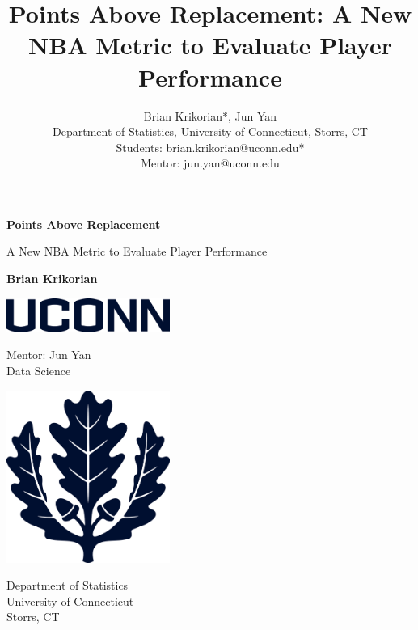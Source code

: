 \documentclass[12pt]{article}
\title{Points Above Replacement: A New NBA Metric to Evaluate Player Performance}
\author{
Brian Krikorian*, Jun Yan \\ \medskip 
Department of Statistics, University of Connecticut, Storrs, CT  \\  \medskip 
Students: brian.krikorian@uconn.edu* \\
Mentor: jun.yan@uconn.edu 
}
\begin{document}
\begin{titlepage}
   \begin{center}
       \vspace*{1cm}
       \Huge
       \textbf{Points Above Replacement}

       \Large
       \vspace{0.5cm}
        A New NBA Metric to Evaluate Player Performance
            
       \vspace{1.5cm}

       \textbf{Brian Krikorian}
       
       \vfill

       \includegraphics[width=0.4\textwidth]{UCONNwordmark}

       \vfill
            
       Mentor: Jun Yan\\
       Data Science
            
       \vspace{0.8cm}
     
       \includegraphics[width=0.4\textwidth]{UCONNoakleaf}
         
        \Large    
       Department of Statistics\\
       University of Connecticut\\
       Storrs, CT\\
            
   \end{center}
\end{titlepage}
\end{document}
